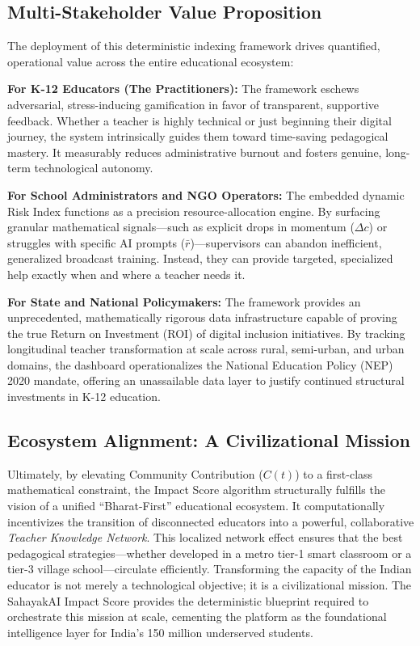 \documentclass[11pt,a4paper]{article}
\begin{document}
\subsection{Multi-Stakeholder Value Proposition}
The deployment of this deterministic indexing framework drives quantified, operational value across the entire educational ecosystem:

\textbf{For K-12 Educators (The Practitioners):} The framework eschews adversarial, stress-inducing gamification in favor of transparent, supportive feedback. Whether a teacher is highly technical or just beginning their digital journey, the system intrinsically guides them toward time-saving pedagogical mastery. It measurably reduces administrative burnout and fosters genuine, long-term technological autonomy.

\textbf{For School Administrators and NGO Operators:} The embedded dynamic Risk Index functions as a precision resource-allocation engine. By surfacing granular mathematical signals---such as explicit drops in momentum ($\Delta c$) or struggles with specific AI prompts ($\bar{r}$)---supervisors can abandon inefficient, generalized broadcast training. Instead, they can provide targeted, specialized help exactly when and where a teacher needs it.

\textbf{For State and National Policymakers:} The framework provides an unprecedented, mathematically rigorous data infrastructure capable of proving the true Return on Investment (ROI) of digital inclusion initiatives. By tracking longitudinal teacher transformation at scale across rural, semi-urban, and urban domains, the dashboard operationalizes the National Education Policy (NEP) 2020 mandate, offering an unassailable data layer to justify continued structural investments in K-12 education.

\subsection{Ecosystem Alignment: A Civilizational Mission}
Ultimately, by elevating Community Contribution ($C(t)$) to a first-class mathematical constraint, the Impact Score algorithm structurally fulfills the vision of a unified ``Bharat-First'' educational ecosystem. It computationally incentivizes the transition of disconnected educators into a powerful, collaborative \textit{Teacher Knowledge Network}. This localized network effect ensures that the best pedagogical strategies---whether developed in a metro tier-1 smart classroom or a tier-3 village school---circulate efficiently. Transforming the capacity of the Indian educator is not merely a technological objective; it is a civilizational mission. The SahayakAI Impact Score provides the deterministic blueprint required to orchestrate this mission at scale, cementing the platform as the foundational intelligence layer for India's 150 million underserved students.
\end{document}

